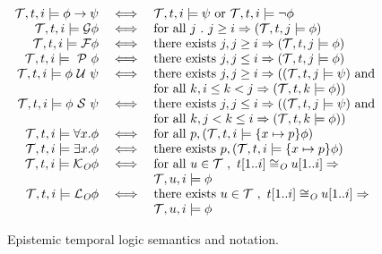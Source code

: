 \documentclass[conference]{IEEEtran}
\theoremstyle{definition}
\newcommand{\aset}[1]{\{#1\}}
\newcommand{\prin}{\textit{O}}
\newcommand{\tr}{t\xspace}
\newcommand{\tset}{\ensuremath{\mathcal{T}}\xspace}
\newcommand{\talways}{\mathcal{G}}
\newcommand{\tfuture}{\mathcal{F}}
\newcommand{\tuntil}{~\mathcal{U}~}
\newcommand{\tsince}{~\mathcal{S}~}
\newcommand{\tpast}{~\mathcal{P}~}
\newcommand{\tknows}[1]{\mathcal{K}_{#1}}
\newcommand{\tpossible}[1]{\mathcal{L}_{#1}}
\newcommand{\limplies}{\rightarrow}
\newcommand{\mimplies}{\Rightarrow}
\begin{document}
\begin{figure}[t]
\begin{displaymath}
\begin{array}{rcl}
      \tset, \tr, i  \models \phi \limplies \psi & \iff &
      \tset, \tr, i  \models \psi \hbox{ or } \tset, \tr, i  \models
      \lnot \phi \\

      \tset, \tr, i  \models \talways \phi & \iff &
      \hbox{for all } j ~.~ j \geq i \mimplies (\tset, \tr, j  \models \phi) \\

      \tset, \tr, i  \models \tfuture \phi & \iff &
      \hbox{there exists } j, j \geq i \mimplies (\tset, \tr, j  \models \phi) \\

      \tset, \tr, i  \models \tpast \phi & \iff &
      \hbox{there exists } j, j \leq i \mimplies (\tset, \tr, j  \models \phi) \\

      \tset, \tr, i  \models \phi \tuntil \psi & \iff &
      \hbox{there exists } j, j \geq i \mimplies ((\tset, \tr, j  \models \psi)
      \hbox{ and } \\
      & & \hbox{for all } k, i \leq k < j \mimplies (\tset, \tr, k 
      \models \phi)) \\

      \tset, \tr, i  \models \phi \tsince \psi & \iff &
      \hbox{there exists } j, j \leq i \mimplies ((\tset, \tr, j  \models \psi)
      \hbox{ and } \\
      & & \hbox{for all } k, j < k \leq i \mimplies (\tset, \tr, k 
      \models \phi)) \\

      \tset, \tr, i  \models \forall x. \phi & \iff &
      \hbox{for all } p, (\tset, \tr, i  \models \aset{x\mapsto p} \phi) \\

      \tset, \tr, i  \models \exists x. \phi & \iff &
      \hbox{there exists } p, (\tset, \tr, i  \models \aset{x\mapsto p} \phi) \\

      \tset, \tr, i  \models \tknows{\prin} \phi & \iff &
      \hbox{for all } u \in \tset ~,~
      \tr[1..i] \cong_{\prin} u[1..i] \mimplies \\ & & 
        \tset, u, i  \models
      \phi \\

      \tset, \tr, i  \models \tpossible{\prin} \phi & \iff &
      \hbox{there exists } u \in \tset ~,~
      \tr[1..i] \cong_{\prin} u[1..i] \mimplies \\ & & 
        \tset, u, i  \models
      \phi \\
    \end{array}
  \end{displaymath}
  
  \caption{Epistemic temporal logic semantics and notation.}
  \label{fig:etl}
\end{figure}
\end{document}
